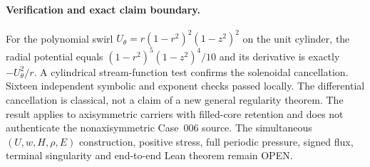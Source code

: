 \paragraph{Verification and exact claim boundary.}
For the polynomial swirl $U_\theta=r(1-r^2)^2(1-z^2)^2$ on the unit cylinder, the radial potential equals $(1-r^2)^5(1-z^2)^4/10$ and its derivative is exactly $-U_\theta^2/r$. A cylindrical stream-function test confirms the solenoidal cancellation. Sixteen independent symbolic and exponent checks passed locally. The differential cancellation is classical, not a claim of a new general regularity theorem. The result applies to axisymmetric carriers with filled-core retention and does not authenticate the nonaxisymmetric Case~006 source. The simultaneous $(U,w,H,\rho,E)$ construction, positive stress, full periodic pressure, signed flux, terminal singularity and end-to-end Lean theorem remain OPEN.
